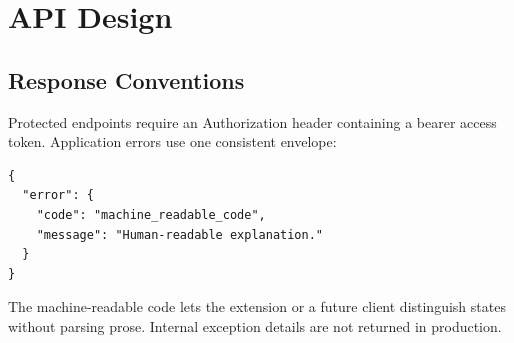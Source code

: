 \documentclass[11pt,a4paper]{report}
\begin{document}
\chapter{API Design}

\section{Response Conventions}
Protected endpoints require an Authorization header containing a bearer access
token. Application errors use one consistent envelope:

\begin{lstlisting}[style=visionx]
{
  "error": {
    "code": "machine_readable_code",
    "message": "Human-readable explanation."
  }
}
\end{lstlisting}

The machine-readable code lets the extension or a future client distinguish
states without parsing prose. Internal exception details are not returned in
production.
\end{document}
